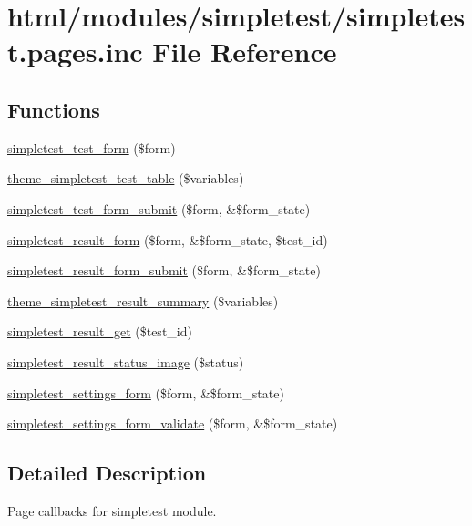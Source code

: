 \hypertarget{simpletest_8pages_8inc}{
\section{html/modules/simpletest/simpletest.pages.inc File Reference}
\label{simpletest_8pages_8inc}
}
\subsection*{Functions}
\begin{DoxyCompactItemize}
\item 
\hyperlink{simpletest_8pages_8inc_a4118469154c4614c80157667a553ec23}{simpletest\_\-test\_\-form} (\$form)
\item 
\hyperlink{group__themeable_gaed0609b7e410d8c7d4588da68d7a6db9}{theme\_\-simpletest\_\-test\_\-table} (\$variables)
\item 
\hyperlink{simpletest_8pages_8inc_ae93012096feaf92ea177eaf496e51356}{simpletest\_\-test\_\-form\_\-submit} (\$form, \&\$form\_\-state)
\item 
\hyperlink{simpletest_8pages_8inc_a7e446dcd8d33e6ec0081c6dc2ecead51}{simpletest\_\-result\_\-form} (\$form, \&\$form\_\-state, \$test\_\-id)
\item 
\hyperlink{simpletest_8pages_8inc_aa49754acf61555f23482a0257db56da2}{simpletest\_\-result\_\-form\_\-submit} (\$form, \&\$form\_\-state)
\item 
\hyperlink{group__themeable_ga2d5ee334c73f279fb02e602ae8bf5edc}{theme\_\-simpletest\_\-result\_\-summary} (\$variables)
\item 
\hyperlink{simpletest_8pages_8inc_a36d253fe9ff7de21a484f1bb0ff9b5a6}{simpletest\_\-result\_\-get} (\$test\_\-id)
\item 
\hyperlink{simpletest_8pages_8inc_a113abd1a787e904816f29e409b4385ea}{simpletest\_\-result\_\-status\_\-image} (\$status)
\item 
\hyperlink{group__forms_gaf74d9bfea1d65a5435e45a36084d10df}{simpletest\_\-settings\_\-form} (\$form, \&\$form\_\-state)
\item 
\hyperlink{simpletest_8pages_8inc_a6ecec99e6260d79bc3a8c0f861da4d9e}{simpletest\_\-settings\_\-form\_\-validate} (\$form, \&\$form\_\-state)
\end{DoxyCompactItemize}


\subsection{Detailed Description}
Page callbacks for simpletest module. 

